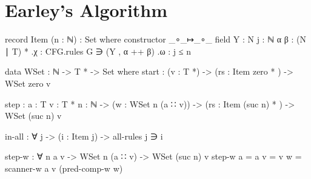 \chapter{Earley's Algorithm}
	
	\begin{code}

		record Item (n : ℕ) : Set where
		  constructor _∘_↦_∘_
		  field
		    Y : N
		    j : ℕ
		    α β : (N ∣ T) *
		    .{χ} : CFG.rules G ∋ (Y , α ++ β)
		    .{ω} : j ≤ n

	\end{code}

	\begin{code}

		data WSet : ℕ -> T * -> Set where
		  start :
		    (v : T *) ->
		    (rs : Item zero * ) ->
		    WSet zero v
		
		  step : {a : T} {v : T *} {n : ℕ} ->
		    (w : WSet n (a ∷ v)) ->
		    (rs : Item (suc n) * ) ->
		    WSet (suc n) v

	\end{code}
	
	\begin{code}

		in-all : ∀ {j} -> (i : Item j) -> all-rules j ∋ i

	\end{code}

	\begin{code}

		step-w : ∀ {n a v} ->
		  WSet n (a ∷ v) ->
		  WSet (suc n) v
		step-w {a = a} {v = v} w = scanner-w a v (pred-comp-w w)
	
	\end{code}
